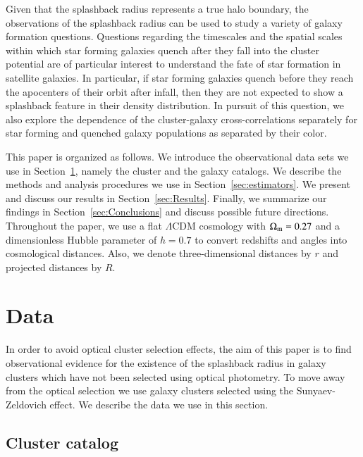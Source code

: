 \documentclass[iop, apjl, twocolappendix, numberedappendix]{emulateapj}
\begin{document}
Given that the splashback radius represents a true halo boundary,
the observations of the splashback radius can be used to study a
variety of galaxy formation questions. Questions regarding the
timescales and the spatial scales within which star forming galaxies
quench after they fall into the cluster potential are of particular
interest to understand the fate of star formation in satellite
galaxies. In particular, if star forming galaxies quench before they
reach the apocenters of their orbit after infall, then they are not
expected to show a splashback feature in their density distribution.
In pursuit of this question, we also explore the dependence of the
cluster-galaxy cross-correlations separately for star forming and
quenched galaxy populations as separated by their color.

This paper is organized as follows. We introduce the observational
data sets we use in Section~\ref{sec:data}, namely the cluster and the
galaxy catalogs. We describe the methods and analysis procedures we
use in Section~\ref{sec:estimators}. We present and discuss our
results in Section~\ref{sec:Results}. Finally, we summarize our
findings in Section~\ref{sec:Conclusions} and discuss possible future
directions. Throughout the paper, we use a flat $\Lambda$CDM cosmology
with $\Omega_{\rm m}=0.27$ and a dimensionless Hubble parameter of $h=0.7$
to convert redshifts and angles into
cosmological distances. Also, we denote three-dimensional distances by
$r$ and projected distances by $R$.


\section{Data}
\label{sec:data}

In order to avoid optical cluster selection effects, the aim of this paper is
to find observational evidence for the existence of the splashback radius in
galaxy clusters which have not been selected using optical photometry. To move
away from the optical selection we use galaxy clusters selected using the
Sunyaev-Zeldovich effect. We describe the data we use in this section.

\subsection{Cluster catalog}
\label{sec:clusters}
\end{document}
